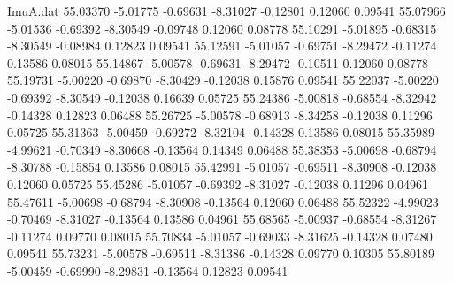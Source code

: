\begin{filecontents}{ImuA.dat}
  55.03370   -5.01775   -0.69631   -8.31027   -0.12801    0.12060    0.09541
  55.07966   -5.01536   -0.69392   -8.30549   -0.09748    0.12060    0.08778
  55.10291   -5.01895   -0.68315   -8.30549   -0.08984    0.12823    0.09541
  55.12591   -5.01057   -0.69751   -8.29472   -0.11274    0.13586    0.08015
  55.14867   -5.00578   -0.69631   -8.29472   -0.10511    0.12060    0.08778
  55.19731   -5.00220   -0.69870   -8.30429   -0.12038    0.15876    0.09541
  55.22037   -5.00220   -0.69392   -8.30549   -0.12038    0.16639    0.05725
  55.24386   -5.00818   -0.68554   -8.32942   -0.14328    0.12823    0.06488
  55.26725   -5.00578   -0.68913   -8.34258   -0.12038    0.11296    0.05725
  55.31363   -5.00459   -0.69272   -8.32104   -0.14328    0.13586    0.08015
  55.35989   -4.99621   -0.70349   -8.30668   -0.13564    0.14349    0.06488
  55.38353   -5.00698   -0.68794   -8.30788   -0.15854    0.13586    0.08015
  55.42991   -5.01057   -0.69511   -8.30908   -0.12038    0.12060    0.05725
  55.45286   -5.01057   -0.69392   -8.31027   -0.12038    0.11296    0.04961
  55.47611   -5.00698   -0.68794   -8.30908   -0.13564    0.12060    0.06488
  55.52322   -4.99023   -0.70469   -8.31027   -0.13564    0.13586    0.04961
  55.68565   -5.00937   -0.68554   -8.31267   -0.11274    0.09770    0.08015
  55.70834   -5.01057   -0.69033   -8.31625   -0.14328    0.07480    0.09541
  55.73231   -5.00578   -0.69511   -8.31386   -0.14328    0.09770    0.10305
  55.80189   -5.00459   -0.69990   -8.29831   -0.13564    0.12823    0.09541
\end{filecontents}
